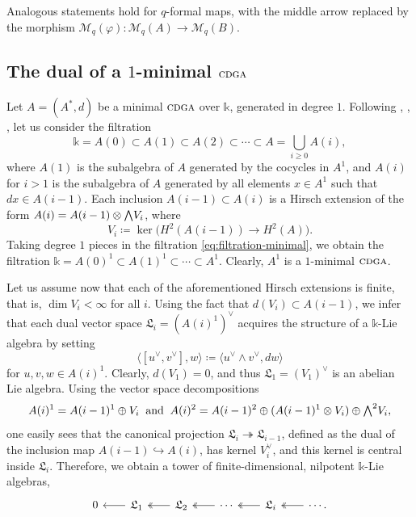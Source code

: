 \documentclass{article}
\numberwithin{equation}{section}
\theoremstyle{definition}
\renewcommand{\k}{\mathbb{k}}
\newcommand{\M}{\mathcal{M}}
\newcommand{\fL}{\mathfrak{L}}
\newcommand{\cdga}{\ensuremath{\textsc{cdga}}}
\newcommand{\surj}{\twoheadrightarrow}
\newcommand{\inj}{\hookrightarrow}
\newcommand{\bwedge}{\mbox{\normalsize $\bigwedge$}}
\begin{document}
Analogous statements hold for $q$-formal maps, with the middle 
arrow replaced by the morphism $\M_q(\varphi)\colon \M_q(A)\to \M_q(B)$.

\subsection{The dual of a $1$-minimal $\cdga$}
\label{subsec:dual-min}
Let $A=(A^{*},d)$ be a minimal $\cdga$ over $\k$, generated in degree $1$. 
Following \cite{Mo}, \cite{Kohno}, \cite{FHT2}, let us consider the filtration
\begin{equation}
\label{eq:filtration-minimal}
\k=A(0)\subset A(1)\subset A(2)\subset \cdots \subset A=\bigcup_{i\ge 0} A(i),
\end{equation}
where $A(1)$ is the subalgebra of $A$ generated by the cocycles in $A^1$,
and $A(i)$ for $i>1$ is the subalgebra of $A$ generated by all elements 
$x\in A^1$ such that $dx\in A(i-1)$.  Each inclusion $A(i-1)\subset A(i)$ is a 
Hirsch extension of the form $A(i)=A(i-1)\otimes \bwedge V_{i}$, where 
\begin{equation}
\label{eq:vi}
V_i\coloneqq \ker\big(H^2(A(i-1))\to H^2(A)\big).
\end{equation}
Taking degree $1$ pieces in the filtration \eqref{eq:filtration-minimal}, 
we obtain the filtration $\k=A(0)^1\subset A(1)^1\subset  \cdots \subset A^1$.  
Clearly, $A^1$ is a $1$-minimal $\cdga$.

Let us assume now that each of the aforementioned Hirsch extensions 
is finite, that is, $\dim V_i<\infty$ for all $i$.  Using the fact that 
$d(V_i)\subset A(i-1)$, we infer that each 
dual vector space $\fL_i=(A(i)^1)^{\vee}$ 
acquires the structure of a $\k$-Lie algebra by setting
\vspace*{-3pt}
\begin{equation}
\label{eq:duality}
\langle [u^{\vee},v^{\vee}], w\rangle \coloneqq 
\langle  u^{\vee}\wedge v^{\vee}, dw \rangle 
\end{equation}
for $u,v,w\in A(i)^1$.  Clearly, $d(V_1)=0$, and thus $\fL_1=(V_1)^{\vee}$ is 
an abelian Lie algebra. Using the vector space decompositions 
\begin{equation}
\label{eq:decomp}
A(i)^1=A(i-1)^1 \oplus V_i \: \text{ and } \:
A(i)^2=A(i-1)^2\oplus (A(i-1)^1\otimes V_i)\oplus \bwedge^2 V_i,
\end{equation}
one easily sees that  the canonical projection $\fL_i\surj \fL_{i-1}$, defined as 
the dual of the inclusion map $A(i-1)\inj A(i)$, has kernel $V_i^{\vee}$, 
and this kernel is central inside $\fL_i$. 
Therefore, we obtain a tower of finite-dimensional,  
nilpotent $\k$-Lie algebras, 
\begin{equation}
\label{eq:nilp lie tower}
\begin{tikzcd}[column sep=20pt]
0 & \fL_1 \ar[l]& \fL_2\ar[l, two heads] & \cdots\ar[l, two heads] & \fL_i 
\ar[l, two heads]& \cdots \ar[l, two heads] .
\end{tikzcd}
\end{equation}
\end{document}

